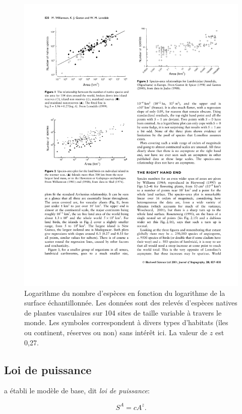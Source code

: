 \documentclass[
  11pt,
  french,
  a4paper,
  extrafontsizes,onecolumn,openright
  ]{memoir}
\newlength{\rf}
\begin{document}
\begin{figure}

{\centering \includegraphics[width=0.8\linewidth]{images/Williamson2001} 

}

\caption{Logarithme du nombre d'espèces en fonction du logarithme de la surface échantillonnée. Les données sont des relevés d'espèces natives de plantes vasculaires sur 104 sites de taille variable à travers le monde. Les symboles correspondent à divers types d'habitats (îles ou continent, réserves ou non) sans intérêt ici. La valeur de \(z\) est 0,27.}\label{fig:Williamson2001}
\end{figure}

\normalsize

\subsection{Loi de puissance}\label{loi-de-puissance}

\textcite{Arrhenius1921} a établi le modèle de base, dit \emph{loi de puissance}:

\begin{equation} 
  \label{eq:Arrhenius1921}
  S^{A} = c A^{z}.
\end{equation}
\end{document}
